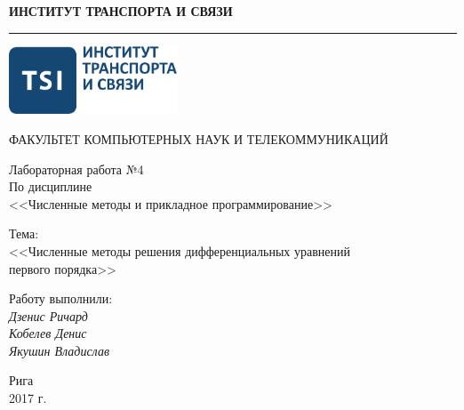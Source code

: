 \documentclass[a4paper]{article}
\begin{document}
% 
\begin{titlepage}
    \begin{center}
        \setlength{\parindent}{0cm}
        \fontsize{16pt}{16pt}\selectfont

        \textbf{ИНСТИТУТ ТРАНСПОРТА И СВЯЗИ}

        \rule{\textwidth}{1pt}

        \vspace*{2.0cm}

        \includegraphics[width=5cm]{../../tsi_logo}

        \vspace*{2.0cm}

        ФАКУЛЬТЕТ КОМПЬЮТЕРНЫХ НАУК И ТЕЛЕКОММУНИКАЦИЙ

        \vspace*{2.0cm}

        Лабораторная работа №4 \\
        По дисциплине \\
        <<Численные методы и прикладное программирование>>

        \vspace*{2.0cm}
        \fontsize{14pt}{14pt}\selectfont
        Тема: \\
        <<Численные методы решения дифференциальных уравнений \\ первого порядка>>

        \vfill
        \fontsize{12pt}{12pt}\selectfont

        \begin{flushright}
            Работу выполнили: \\
            \vspace*{0.25cm}
            {\itshape Дзенис Ричард} \\
            {\itshape Кобелев Денис} \\
            {\itshape Якушин Владислав} \\
        \end{flushright}

        \vfill

        Рига \\ 2017 г.
    \end{center}
\end{titlepage}
\end{document}
